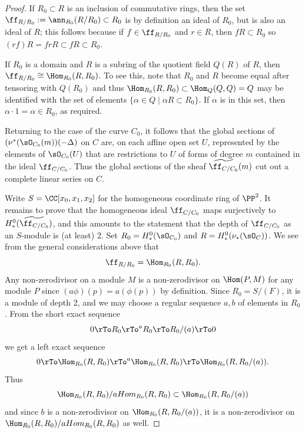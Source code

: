 \begin{proof}
If $R_{0}\subset R$ is an inclusion of commutative rings, then the set
$\ff_{R/R_{0}} := \ann_{R_{0}}(R/R_{0})\subset R_{0}$ is by definition an ideal of $R_{0}$, but is also an ideal of $R$; this follows
because if $f\in \ff_{R/R_{0}}$ and $r\in R$, then $fR\subset R_{0}$ so
 $(rf)R = frR \subset fR \subset R_{0}$. 

If $R_{0}$ is a domain and $R$ is a subring of the quotient field $Q(R)$ of $R$, then
 $\ff_{R/R_{0}} \cong \Hom_{R_{0}}(R, R_{0})$. To see this, note that $R_{0}$ and $R$ become
 equal after tensoring with $Q(R_{0})$ and thus 
 $\Hom_{R_{0}}(R,R_{0}) \subset \Hom_{Q}(Q,Q) = Q$ 
 may be identified
 with the set of elements $\{\alpha\in Q\mid \alpha R \subset R_{0}\}$. If $\alpha$ is in this set, then
  $\alpha\cdot 1 = \alpha \in R_{0}$, as required.
  
Returning to the case of the curve $C_{0}$, it follows that the global sections of $(\nu^{*}(\sO_{C_{0}}(m))( -\Delta)$ on $C$
are, on each affine open set $U$, represented by the elements of $\sO_{C_{0}}(U)$ that  are restrictions to $U$
of forms of degree $m$ contained in 
the ideal $\ff_{C/C_{0}}$. Thus
the global sections of the sheaf $\widetilde{\ff_{C/C_{0}}}(m)$ cut out a complete linear series on $C$.

Write $S =\CC[x_{0}, x_{1}, x_{2}]$ for the homogeneous coordinate ring of $\PP^{2}$.
It remains to prove that the homogeneous ideal $\ff_{C/C_{0}}$ maps
surjectively to $H^{0}_{*}(\widetilde{\ff_{C/C_{0}}})$, and this amounts to the
statement that the depth of $\ff_{C/C_{0}}$ as an $S$-module is (at least) 2.
Set $R_{0} = H^{0}_{*}(\sO_{C_{0}})$ and $R = H^{0}_{*}(\nu_{*} (\sO_{C}))$.
We see from the general considerations above that
$$
\ff_{R/R_{0}} = \Hom_{R_{0}}(R, R_{0}).
$$ 
Any non-zerodivisor on a module $M$
is a non-zerodivisor on $\Hom(P, M)$ for any module $P$ since $(a\phi)(p) = a(\phi(p))$ by definition. 
Since $R_{0} = S/(F)$, it is a module of depth 2, and we may choose a regular sequence
$a,b$ of elements in $R_{0}$. From the short exact sequence
$$
0\rTo R_{0}\rTo^{a} R_{0}\rTo R_{0}/(a) \rTo 0
$$
we get a left exact sequence
$$
0\rTo \Hom_{R_{0}}(R,R_{0})\rTo^{a} \Hom_{R_{0}}(R,R_{0})\rTo \Hom_{R_{0}}(R,R_{0}/(a)).
$$
Thus 
$$
\Hom_{R_{0}}(R,R_{0})/aHom_{R_{0}}(R,R_{0}) \subset \Hom_{R_{0}}(R,R_{0}/(a))
$$
and since $b$ is a non-zerodivisor on $\Hom_{R_{0}}(R,R_{0}/(a))$, it is a non-zerodivisor
on $\Hom_{R_{0}}(R,R_{0})/aHom_{R_{0}}(R,R_{0})$ as well.
\end{proof}

